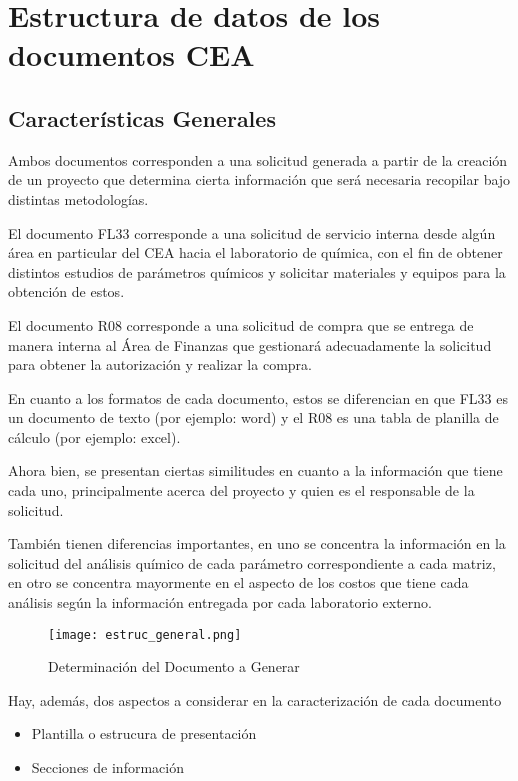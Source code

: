 \chapter{Estructura de datos de los documentos CEA}
\section*{Características Generales}

Ambos documentos corresponden a una solicitud generada a partir de la creación de un proyecto que determina cierta información que será necesaria recopilar bajo distintas metodologías.

El documento FL33 corresponde a una solicitud de servicio interna desde algún área en particular del CEA hacia el laboratorio de química, con el fin de obtener distintos estudios de parámetros químicos y solicitar materiales y equipos para la obtención de estos.

El documento R08 corresponde a una solicitud de compra que se entrega de manera interna al Área de Finanzas que gestionará adecuadamente la solicitud para obtener la autorización y realizar la compra.

En cuanto a los formatos de cada documento, estos se diferencian en que FL33 es un documento de texto (por ejemplo: word) y el R08 es una tabla de planilla de cálculo (por ejemplo: excel).

Ahora bien, se presentan ciertas similitudes en cuanto a la información que tiene cada uno, principalmente acerca del proyecto y quien es el responsable de la solicitud.

También tienen diferencias importantes, en uno se concentra la información en la solicitud del análisis químico de cada parámetro correspondiente a cada matriz, en otro se concentra mayormente en el aspecto de los costos que tiene cada análisis según la información entregada por cada laboratorio externo. 

\begin{figure}
\texttt{[image: estruc\_general.png]}
\caption{Determinación del Documento a Generar}
\label{determinacion_doc}
\end{figure}

Hay, además, dos aspectos a considerar en la caracterización de cada documento

\begin{itemize}
	\item Plantilla o estrucura de presentación
	\item Secciones de información
\end{itemize}


